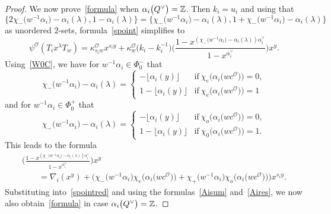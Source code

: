 \begin{proof}
We now prove~\eqref{formula} when $\alpha_i\smash{\bigl(Q^\vee\bigr)}=\mathbb{Z}$. Then $k_i=u_i$ and using that
\[
\bigl\{2\chi_-\bigl(w^{-1}\alpha_i\bigr)-\alpha_i(\lambda), 1-\alpha_i(\lambda)\bigr\}=\bigl\{\chi_-\bigl(w^{-1}\alpha_i\bigr)-\alpha_i(\lambda),1+\chi_-\bigl(w^{-1}\alpha_i\bigr)-\alpha_i(\lambda)\bigr\}
\]
as unordered $2$-sets,
formula~\eqref{spoint} simplifies to
\begin{equation}\label{spointred}
\psi^\mathcal{O}(T_ix^\lambda T_w)=\kappa_{s_iw}^\mathcal{O}x^{s_iy}
+\kappa_w^\mathcal{O}\bigl(k_i-k_i^{-1}\bigr)\Biggl(\frac{1-x^{(\chi_-\bigl(w^{-1}\alpha_i\bigr)-\alpha_i(\lambda))\alpha_i^\vee}}{1-x^{\alpha_i^\vee}}\Biggr)x^{y}.
\end{equation}
Using~\eqref{W0C}, we have for $w^{-1}\alpha_i\in\Phi_0^-$ that
\begin{equation*}
\chi_-\bigl(w^{-1}\alpha_i\bigr)-\alpha_i(\lambda)=
\begin{cases}
-\lfloor\alpha_i(y)\rfloor &\text{if}\ \chi_e\bigl(\alpha_i\bigl(wc^\mathcal{O}\bigr)\bigr)=0,\\
1-\lfloor\alpha_i(y)\rfloor &\text{if}\ \chi_e\bigl(\alpha_i\bigl(wc^\mathcal{O}\bigr)\bigr)=1
\end{cases}
\end{equation*}
and for $w^{-1}\alpha_i\in\Phi_0^+$ that
\begin{equation*}
\chi_-\bigl(w^{-1}\alpha_i\bigr)-\alpha_i(\lambda)=
\begin{cases}
-\lfloor\alpha_i(y)\rfloor &\text{if}\ \chi_o\bigl(\alpha_i\bigl(wc^\mathcal{O}\bigr)\bigr)=0,\\
1-\lfloor\alpha_i(y)\rfloor &\text{if}\ \chi_0\bigl(\alpha_i\bigl(wc^\mathcal{O}\bigr)\bigr)=1.
\end{cases}
\end{equation*}
This leads to the formula
\begin{gather*}
\Biggl(\frac{1-x^{(\chi_-\bigl(w^{-1}\alpha_i\bigr)-\alpha_i(\lambda))\alpha_i^\vee}}{1-x^{\alpha_i^\vee}}\Biggr)x^{y}\\
\qquad{}{}=
\nabla_i(x^y)+\bigl(\chi_-\bigl(w^{-1}\alpha_i\bigr)\chi_e\bigl(\alpha_i\bigl(wc^\mathcal{O}\bigr)\bigr)+\chi_+\bigl(w^{-1}\alpha_i\bigr)\chi_o\bigl(\alpha_i\bigl(wc^\mathcal{O}\bigr)\bigr)\bigr)x^{s_iy}.
\end{gather*}
Substituting into~\eqref{spointred} and using the formulas~\eqref{Aisum} and~\eqref{Aires}, we now also obtain~\eqref{formula} in case $\alpha_i\smash{\bigl(Q^\vee\bigr)}=\mathbb{Z}$.



\end{proof}
